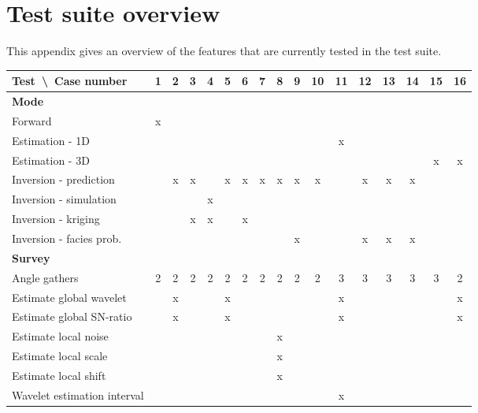 \chapter{Test suite overview}
\label{sec:test-suite-overview}

This appendix gives an overview of the features that are currently
tested in the test suite. 

\newcommand{\mc}[1]{\multicolumn{17}{|l|}{\textbf{#1}}}



\small
\begin{tabular}{|l|c|c|c|c|c|c|c|c|c|c|c|c|c|c|c|c|}\hline
Test\ \textbackslash\ Case number  & 1 & 2 & 3 & 4 & 5 & 6 & 7 & 8 & 9 &10 &11 &12 &13 &14 &15 & 16\\ \hline
\mc{Mode}\\ \hline
\quad Forward                      & x &   &   &   &   &   &   &   &   &   &   &   &   &   &   &  \\ \hline
\quad Estimation - 1D              &   &   &   &   &   &   &   &   &   &   & x &   &   &   &   &  \\ \hline
\quad Estimation - 3D              &   &   &   &   &   &   &   &   &   &   &   &   &   &   & x & x\\ \hline
\quad Inversion - prediction       &   & x & x &   & x & x & x & x & x & x &   & x & x & x &   &  \\ \hline
\quad Inversion - simulation       &   &   &   & x &   &   &   &   &   &   &   &   &   &   &   &  \\ \hline
\quad Inversion - kriging          &   &   & x & x &   & x &   &   &   &   &   &   &   &   &   &  \\ \hline
\quad Inversion - facies prob.     &   &   &   &   &   &   &   &   & x &   &   & x & x & x &   &  \\ \hline

\mc{Survey}\\ \hline
\quad Angle gathers                & 2 & 2 & 2 & 2 & 2 & 2 & 2 & 2 & 2 & 2 & 3 & 3 & 3 & 3 & 3 & 2\\ \hline
\quad Estimate global wavelet      &   & x &   &   & x &   &   &   &   &   & x &   &   &   &   & x\\ \hline
\quad Estimate global SN-ratio     &   & x &   &   & x &   &   &   &   &   & x &   &   &   &   & x\\ \hline
\quad Estimate local noise         &   &   &   &   &   &   &   & x &   &   &   &   &   &   &   &  \\ \hline
\quad Estimate local scale         &   &   &   &   &   &   &   & x &   &   &   &   &   &   &   &  \\ \hline
\quad Estimate local shift         &   &   &   &   &   &   &   & x &   &   &   &   &   &   &   &  \\ \hline
\quad Wavelet estimation interval  &   &   &   &   &   &   &   &   &   &   & x &   &   &   &   &  \\ \hline


\end{tabular}

